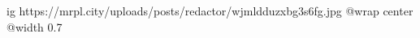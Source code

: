  
 
 
 
 

\ifcmt
  ig https://mrpl.city/uploads/posts/redactor/wjmldduzxbg3s6fg.jpg
  @wrap center
  @width 0.7
\fi
